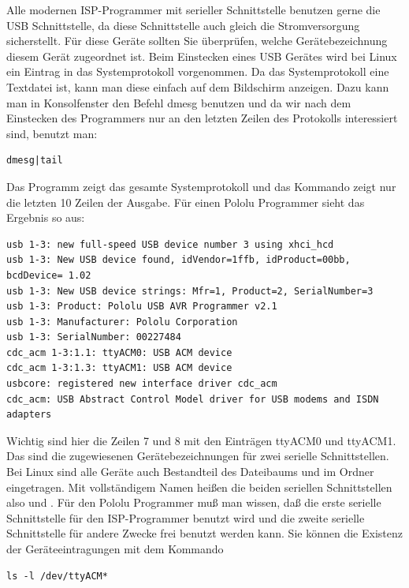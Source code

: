 Alle modernen ISP-Programmer mit serieller Schnittstelle benutzen gerne die USB Schnittstelle,
da diese Schnittstelle auch gleich die Stromversorgung sicherstellt.
Für diese Geräte sollten Sie überprüfen, welche Gerätebezeichnung
diesem Gerät zugeordnet ist.
Beim Einstecken eines USB Gerätes wird bei Linux ein Eintrag in das
Systemprotokoll vorgenommen.
Da das Systemprotokoll eine Textdatei ist,
kann man diese einfach auf dem Bildschirm anzeigen.
Dazu kann man in Konsolfenster den Befehl dmesg benutzen und da wir nach dem
Einstecken des Programmers nur an den letzten Zeilen des Protokolls
interessiert sind, benutzt man:
\begin{large} \vspace{-0.4em} \begin{verbatim}
dmesg|tail
\end{verbatim} \end{large}
Das  Programm zeigt das gesamte Systemprotokoll und das Kommando 
 zeigt nur die letzten 10 Zeilen der Ausgabe.
Für einen Pololu Programmer sieht das Ergebnis so aus:
\begin{footnotesize} \begin{verbatim}
usb 1-3: new full-speed USB device number 3 using xhci_hcd
usb 1-3: New USB device found, idVendor=1ffb, idProduct=00bb, bcdDevice= 1.02
usb 1-3: New USB device strings: Mfr=1, Product=2, SerialNumber=3
usb 1-3: Product: Pololu USB AVR Programmer v2.1
usb 1-3: Manufacturer: Pololu Corporation
usb 1-3: SerialNumber: 00227484
cdc_acm 1-3:1.1: ttyACM0: USB ACM device
cdc_acm 1-3:1.3: ttyACM1: USB ACM device
usbcore: registered new interface driver cdc_acm
cdc_acm: USB Abstract Control Model driver for USB modems and ISDN adapters
\end{verbatim} \end{footnotesize}
Wichtig sind hier die Zeilen 7 und 8 mit den Einträgen ttyACM0 und ttyACM1.
Das sind die zugewiesenen Gerätebezeichnungen für zwei serielle Schnittstellen.
Bei Linux sind alle Geräte auch Bestandteil des Dateibaums und im
Ordner  eingetragen. Mit vollständigem Namen heißen die
beiden seriellen Schnittstellen also  und .
Für den Pololu Programmer muß man wissen, daß die erste serielle Schnittstelle
für den ISP-Programmer benutzt wird und die zweite serielle Schnittstelle
für andere Zwecke frei benutzt werden kann.
Sie können die Existenz der Geräteeintragungen mit dem Kommando
\begin{large} \vspace{-0.4em} \begin{verbatim}
ls -l /dev/ttyACM*
\end{verbatim} \end{large}
